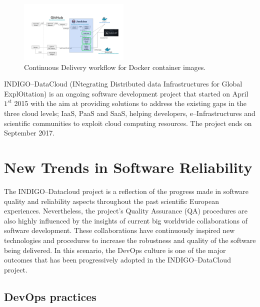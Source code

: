 \documentclass[journal]{IEEEtran}
\begin{document}
\begin{figure}[!t]
\centering
\includegraphics[width=0.47\textwidth]{images/devops.png}
\caption{Continuous Delivery workflow for Docker container images.}
\label{fig:fig_CD}
\end{figure}

INDIGO--DataCloud (INtegrating Distributed data Infrastructures for Global ExplOitation) \cite{cordis:indigo} is an ongoing software development project that started on April $1^{st}$ 2015 with the aim at providing solutions to address the existing gaps in the three cloud levels; IaaS, PaaS and SaaS, helping developers, e--Infrastructures and scientific communities to exploit cloud computing resources. The project ends on September 2017.

\section{New Trends in Software Reliability}

The INDIGO--Datacloud project is a reflection of the progress made in software quality and reliability aspects throughout the past scientific European experiences. Nevertheless, the project’s Quality Assurance (QA) procedures are also highly influenced by the insights of current big worldwide collaborations of software development. These collaborations have continuously inspired new technologies and procedures to increase the robustness and quality of the software being delivered. In this scenario, the DevOps culture is one of the major outcomes that has been progressively adopted in the INDIGO--DataCloud project.

\subsection{DevOps practices}
\end{document}
